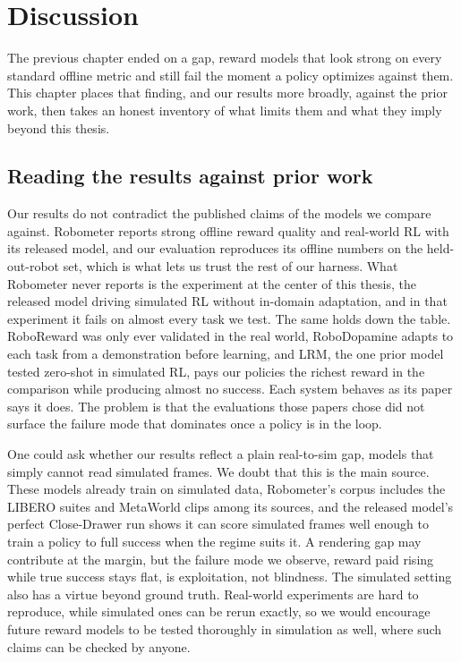 \chapter{Discussion}
\label{sec:discussion}

The previous chapter ended on a gap, reward models that look strong on every standard offline metric and still fail the moment a policy optimizes against them. This chapter places that finding, and our results more broadly, against the prior work, then takes an honest inventory of what limits them and what they imply beyond this thesis.

\section{Reading the results against prior work}

Our results do not contradict the published claims of the models we compare against. Robometer reports strong offline reward quality and real-world RL with its released model, and our evaluation reproduces its offline numbers on the held-out-robot set, which is what lets us trust the rest of our harness. What Robometer never reports is the experiment at the center of this thesis, the released model driving simulated RL without in-domain adaptation, and in that experiment it fails on almost every task we test. The same holds down the table. RoboReward was only ever validated in the real world, RoboDopamine adapts to each task from a demonstration before learning, and LRM, the one prior model tested zero-shot in simulated RL, pays our policies the richest reward in the comparison while producing almost no success. Each system behaves as its paper says it does. The problem is that the evaluations those papers chose did not surface the failure mode that dominates once a policy is in the loop.

One could ask whether our results reflect a plain real-to-sim gap, models that simply cannot read simulated frames. We doubt that this is the main source. These models already train on simulated data, Robometer's corpus includes the LIBERO suites and MetaWorld clips among its sources, and the released model's perfect Close-Drawer run shows it can score simulated frames well enough to train a policy to full success when the regime suits it. A rendering gap may contribute at the margin, but the failure mode we observe, reward paid rising while true success stays flat, is exploitation, not blindness. The simulated setting also has a virtue beyond ground truth. Real-world experiments are hard to reproduce, while simulated ones can be rerun exactly, so we would encourage future reward models to be tested thoroughly in simulation as well, where such claims can be checked by anyone.

